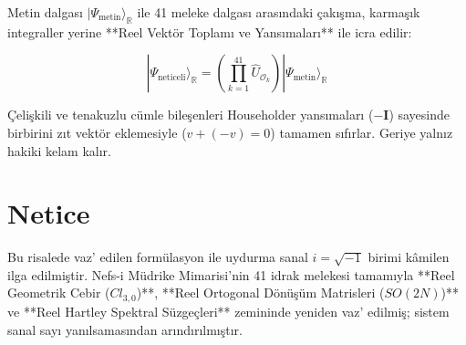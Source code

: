 \documentclass[11pt, a4paper]{article}
\begin{document}
Metin dalgası $|\Psi_{\text{metin}}\rangle_{\mathbb{R}}$ ile 41 meleke dalgası arasındaki çakışma, karmaşık integraller yerine **Reel Vektör Toplamı ve Yansımaları** ile icra edilir:

\begin{equation}
|\Psi_{\text{neticeli}}\rangle_{\mathbb{R}} = \left( \prod_{k=1}^{41} \hat{U}_{\mathcal{O}_k} \right) |\Psi_{\text{metin}}\rangle_{\mathbb{R}}
\end{equation}

Çelişkili ve tenakuzlu cümle bileşenleri Householder yansımaları ($-\mathbf{I}$) sayesinde birbirini zıt vektör eklemesiyle ($v + (-v) = 0$) tamamen sıfırlar. Geriye yalnız hakiki kelam kalır.

\section{Netice}

Bu risalede vaz' edilen formülasyon ile uydurma sanal $i = \sqrt{-1}$ birimi kâmilen ilga edilmiştir. Nefs-i Müdrike Mimarisi'nin 41 idrak melekesi tamamıyla **Reel Geometrik Cebir ($Cl_{3,0}$)**, **Reel Ortogonal Dönüşüm Matrisleri ($SO(2N)$)** ve **Reel Hartley Spektral Süzgeçleri** zemininde yeniden vaz' edilmiş; sistem sanal sayı yanılsamasından arındırılmıştır.
\end{document}
